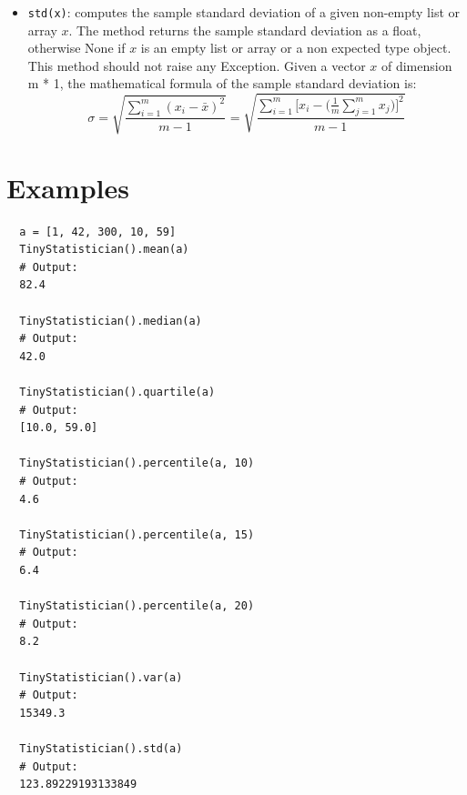 \documentclass{42-en}
\begin{document}
\begin{itemize}
  \item \texttt{std(x)}: computes the sample standard deviation of a given non-empty list or array $x$.
        The method returns the sample standard deviation as a float,
        otherwise None if $x$ is an empty list or array or a non expected type object.
        This method should not raise any Exception.
        \newline
        Given a vector $x$ of dimension m * 1, the mathematical formula of the sample standard deviation is:
        $$
        \sigma = \sqrt{\frac{\sum_{i = 1}^{m}{(x_i - \bar{x})^2}}{m - 1}} = \sqrt{\frac{\sum_{i = 1}^{m}{[x_i - (\frac{1}{m}\sum_{j = 1}^{m}{x_j}})]^2}{m - 1}}
        $$
\end{itemize}

\section*{Examples}

\begin{verbatim}  
  a = [1, 42, 300, 10, 59]
  TinyStatistician().mean(a)
  # Output:
  82.4

  TinyStatistician().median(a)
  # Output:
  42.0

  TinyStatistician().quartile(a)
  # Output:
  [10.0, 59.0]

  TinyStatistician().percentile(a, 10)
  # Output:
  4.6

  TinyStatistician().percentile(a, 15)
  # Output:
  6.4

  TinyStatistician().percentile(a, 20)
  # Output:
  8.2

  TinyStatistician().var(a)
  # Output:
  15349.3

  TinyStatistician().std(a)
  # Output:
  123.89229193133849
\end{verbatim}



\newpage

\end{document}
